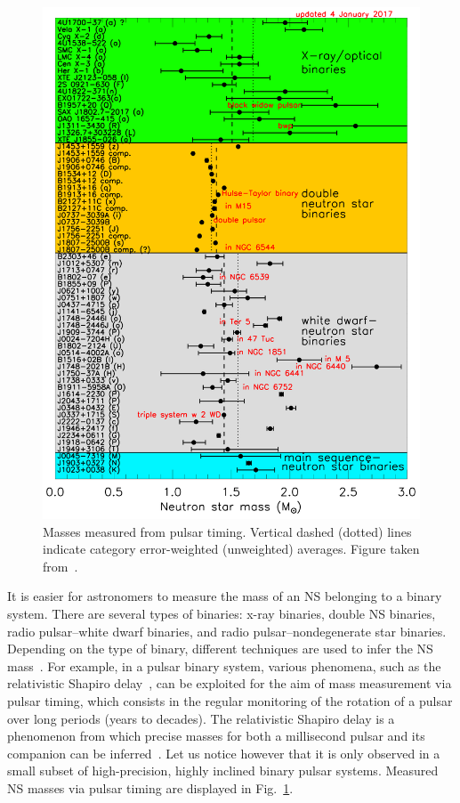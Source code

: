 \begin{figure}[!t]
\begin{center}
  \includegraphics[width=0.7\linewidth]{figures/masses.png}
\end{center}
\caption[Masses measured from pulsar timing]{Masses 
measured from pulsar timing. Vertical dashed (dotted) lines indicate category 
error-weighted (unweighted) averages. Figure taken 
from~\cite{Lattimer2019}.}\label{fig:masses_lattimer}
\end{figure}
%
It is easier for astronomers to measure the mass of an NS belonging to a binary 
system. There are several types of binaries: x-ray binaries, double NS 
binaries, radio pulsar--white dwarf binaries, and radio pulsar--nondegenerate 
star binaries. Depending on the type of binary, different techniques are used 
to infer the NS mass~\cite{Haensel2007}.
For example, in a pulsar binary system, various phenomena, such as the 
relativistic Shapiro delay~\cite{Shapiro1964}, can be exploited for the aim of
mass measurement via pulsar timing, which consists in the regular monitoring of 
the rotation of a pulsar over long periods (years to decades). The relativistic 
Shapiro delay is a phenomenon from which precise masses for both a millisecond 
pulsar and its companion can be inferred~\cite{Demorest2010,Cromartie2020}. Let 
us notice however that it is only observed in a small subset of high-precision, 
highly inclined binary pulsar systems. Measured NS masses via pulsar timing are
displayed in Fig.~\ref{fig:masses_lattimer}. 

